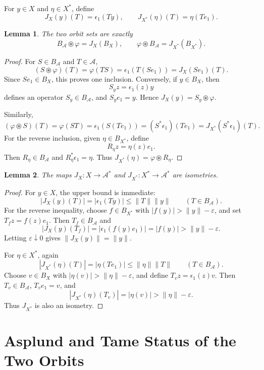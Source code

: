 \documentclass[11pt]{article}
\newtheorem{lemma}{Lemma}
\newcommand{\A}{\mathcal A}
\newcommand{\eps}{\varepsilon}
\begin{document}
For \(y\in X\) and \(\eta\in X^*\), define
\[
   J_X(y)(T)=\epsilon_1(Ty),
   \qquad
   J_{X^*}(\eta)(T)=\eta(Te_1).
\]

\begin{lemma}\label{lem:orbits}
The two orbit sets are exactly
\[
   B_\A\circledast\varphi=J_X(B_X),
   \qquad
   \varphi\circledast B_\A=J_{X^*}(B_{X^*}).
\]
\end{lemma}

\begin{proof}
For \(S\in B_\A\) and \(T\in\A\),
\[
  (S\circledast\varphi)(T)=\varphi(TS)=\epsilon_1(T(S e_1))
       =J_X(S e_1)(T).
\]
Since \(S e_1\in B_X\), this proves one inclusion.  Conversely, if
\(y\in B_X\), then
\[
   S_y z=\epsilon_1(z)y
\]
defines an operator \(S_y\in B_\A\), and \(S_y e_1=y\).  Hence
\(J_X(y)=S_y\circledast\varphi\).

Similarly,
\[
  (\varphi\circledast S)(T)=\varphi(ST)=\epsilon_1(S(Te_1))
       =(S^*\epsilon_1)(Te_1)=J_{X^*}(S^*\epsilon_1)(T).
\]
For the reverse inclusion, given \(\eta\in B_{X^*}\), define
\[
   R_\eta z=\eta(z)e_1 .
\]
Then \(R_\eta\in B_\A\) and \(R_\eta^*\epsilon_1=\eta\).  Thus
\(J_{X^*}(\eta)=\varphi\circledast R_\eta\).
\end{proof}

\begin{lemma}\label{lem:isometric}
The maps \(J_X:X\to\A^*\) and \(J_{X^*}:X^*\to\A^*\) are isometries.
\end{lemma}

\begin{proof}
For \(y\in X\), the upper bound is immediate:
\[
  |J_X(y)(T)|=|\epsilon_1(Ty)|\le \|T\|\|y\|
       \qquad (T\in B_\A).
\]
For the reverse inequality, choose \(f\in B_{X^*}\) with
\(|f(y)|>\|y\|-\eps\), and set \(T_f z=f(z)e_1\).  Then \(T_f\in B_\A\) and
\[
   |J_X(y)(T_f)|=|\epsilon_1(f(y)e_1)|=|f(y)|>\|y\|-\eps .
\]
Letting \(\eps\downarrow0\) gives \(\|J_X(y)\|=\|y\|\).

For \(\eta\in X^*\), again
\[
  |J_{X^*}(\eta)(T)|=|\eta(Te_1)|\le \|\eta\|\|T\|
       \qquad (T\in B_\A).
\]
Choose \(v\in B_X\) with \(|\eta(v)|>\|\eta\|-\eps\), and define
\(T_v z=\epsilon_1(z)v\).  Then \(T_v\in B_\A\), \(T_v e_1=v\), and
\[
   |J_{X^*}(\eta)(T_v)|=|\eta(v)|>\|\eta\|-\eps .
\]
Thus \(J_{X^*}\) is also an isometry.
\end{proof}

\section*{Asplund and Tame Status of the Two Orbits}
\end{document}
